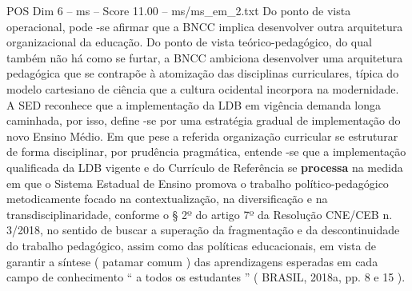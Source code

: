 \begin{textsample}{POS Dim 6 – ms – Score 11.00 – ms/ms\_em\_2.txt}
Do ponto de vista operacional, pode -se afirmar que a BNCC implica desenvolver outra arquitetura organizacional da educação.
Do ponto de vista teórico-pedagógico, do qual também não há como se furtar, a BNCC ambiciona desenvolver uma arquitetura pedagógica que se contrapõe à atomização das disciplinas curriculares, típica do modelo cartesiano de ciência que a cultura ocidental incorpora na modernidade.
A SED reconhece que a implementação da LDB em vigência demanda longa caminhada, por isso, define -se por uma estratégia gradual de implementação do novo Ensino Médio.
Em que pese a referida organização curricular se estruturar de forma disciplinar, por prudência pragmática, entende -se que a implementação qualificada da LDB vigente e do Currículo de Referência se \textbf{processa} na medida em que o Sistema Estadual de Ensino promova o trabalho político-pedagógico metodicamente focado na contextualização, na diversificação e na transdisciplinaridade, conforme o § 2º do artigo 7º da Resolução CNE/CEB n. 3/2018, no sentido de buscar a superação da fragmentação e da descontinuidade do trabalho pedagógico, assim como das políticas educacionais, em vista de garantir a síntese ( patamar comum ) das aprendizagens esperadas em cada campo de conhecimento “ a todos os estudantes ” ( BRASIL, 2018a, pp. 8 e 15 ).

\end{textsample}
